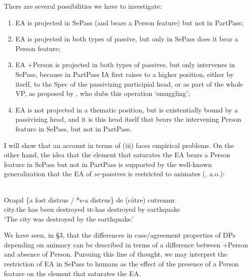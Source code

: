 \documentclass[output=paper]{langsci/langscibook}
\begin{document}
There are several possibilities we have to investigate:

\begin{enumerate}[label=(\roman*)]
\item EA is projected in SePass (and bears a Person feature) but not in PartPass; 
\item EA is projected in both types of passive, but only in SePass does it bear a Person feature;
\item EA +Person is projected in both types of passives, but only intervenes in SePass, because in PartPass IA first raises to a higher position, either by itself, to the Spec of the passivizing participial head, or as part of the whole VP, as proposed by \citet{Collins2005}, who dubs this operation ‘smuggling'; 
\item EA is not projected in a thematic position, but is existentially bound by a passivizing head, and it is this head itself that bears the intervening Person feature in SePass, but not in PartPass.
\end{enumerate} 


  I will show that an account in terms of (iii) faces empirical problems. On the other hand, the idea that the element that saturates the EA bears a Person feature in SePass but not in PartPass is supported by the well-known generalization that the EA of \textit{se-}passives is restricted to animates (\citealt{Burzio1994,Cornilescu1998,Dobrovie-Sorin2017,Zribi-Hertz2008}, a.o.):

\ea%
            \label{ex:giurgea:28}\\
    \gll Oraşul \{a    fost  distrus      / *s-a      distrus\}   {de (către)} cutremur.\\
         city.the  has been destroyed  {}  \textsc{se-}has destroyed by            earthquake\\
    \glt ‘The city was destroyed by the earthquake.’
    \z

          

We have seen, in §3, that the differences in case\slash agreement properties of DPs depending on animacy can be described in terms of a difference between +Person and absence of Person. Pursuing this line of thought, we may interpret the restriction of EA in SePass to humans as the effect of the presence of a Person feature on the element that saturates the EA.
\end{document}
